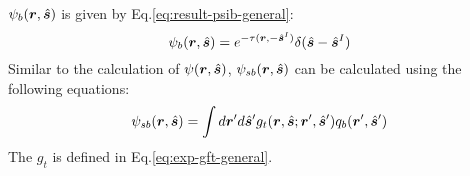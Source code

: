 \documentclass [10pt,letterpaper]{article}
\renewcommand{\vec}{\vectorsym}
\newcommand{\unitvec}[1]{\hat{\vec{#1}}}
\begin{document}
$\psi_b(\vec{r},\unitvec{s})$ is given by Eq.\eqref{eq:result-psib-general}:
\begin{equation} \label{eq:result-psib-general-2ndtime}
	\psi_b(\vec{r},\unitvec{s})
	=
	e^{-\tau(\vec{r},-\unitvec{s}^I)}
	\delta(\unitvec{s}-\unitvec{s}^I)
\end{equation}
Similar to the calculation of $\psi(\vec{r},\unitvec{s})$, $\psi_{sb}(\vec{r},\unitvec{s})$ can be calculated using the following equations:
\begin{equation} \label{eq:der-psisb-general}
	\psi_{sb}(\vec{r},\unitvec{s})
	=
	\int d\vec{r}^\prime d\unitvec{s}^\prime
	g_t(\vec{r},\unitvec{s};\vec{r}^\prime,\unitvec{s}^\prime) 
	q_b(\vec{r}^\prime,\unitvec{s}^\prime) 
\end{equation}
The $g_t$ is defined in Eq.\eqref{eq:exp-gft-general}.
\end{document}
